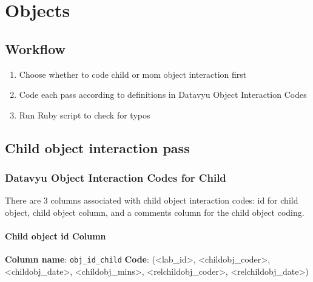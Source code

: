 \documentclass[
  12pt,
]{book}
\providecommand{\tightlist}{%
  \setlength{\itemsep}{0pt}\setlength{\parskip}{0pt}}
\begin{document}
\hypertarget{objects}{%
\chapter{Objects}\label{objects}}

\hypertarget{workflow-3}{%
\section{Workflow}\label{workflow-3}}

\begin{enumerate}
\def\labelenumi{\arabic{enumi}.}
\tightlist
\item
  Choose whether to code child or mom object interaction first
\item
  Code each pass according to definitions in Datavyu Object Interaction Codes
\item
  Run Ruby script to check for typos
\end{enumerate}

\hypertarget{child-object-interaction-pass}{%
\section{Child object interaction pass}\label{child-object-interaction-pass}}

\hypertarget{datavyu-object-interaction-codes-for-child}{%
\subsection*{Datavyu Object Interaction Codes for Child}\label{datavyu-object-interaction-codes-for-child}}

There are 3 columns associated with child object interaction codes: id for child object, child object column, and a comments column for the child object coding.

\hypertarget{child-object-id-column}{%
\subsubsection*{Child object id Column}\label{child-object-id-column}}

\textbf{Column name}: \texttt{obj\_id\_child}
\textbf{Code}: (\textless lab\_id\textgreater, \textless childobj\_coder\textgreater, \textless childobj\_date\textgreater, \textless childobj\_mins\textgreater, \textless relchildobj\_coder\textgreater, \textless relchildobj\_date\textgreater)
\end{document}
